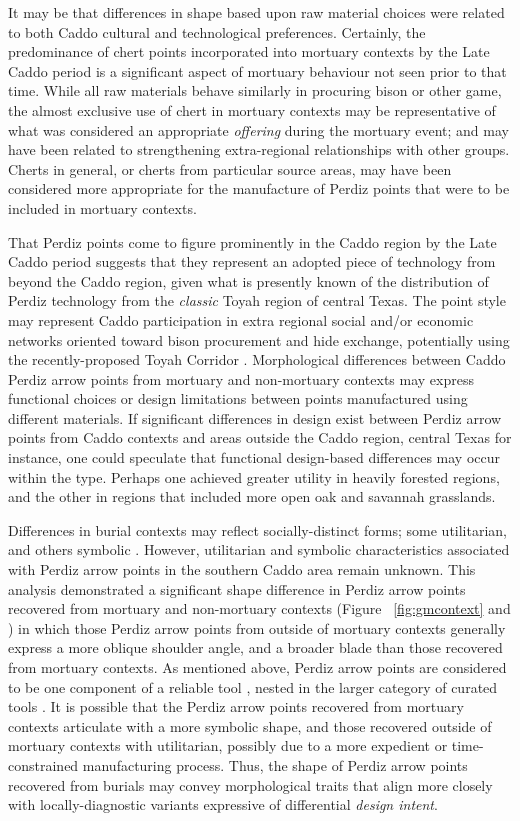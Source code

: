 \documentclass[review]{elsarticle}
\begin{document}
It may be that differences in shape based upon raw material choices were related to both Caddo cultural and technological preferences. Certainly, the predominance of chert points incorporated into mortuary contexts by the Late Caddo period is a significant aspect of mortuary behaviour not seen prior to that time. While all raw materials behave similarly in procuring bison or other game, the almost exclusive use of chert in mortuary contexts may be representative of what was considered an appropriate \textit{offering} during the mortuary event; and may have been related to strengthening extra-regional relationships with other groups. Cherts in general, or cherts from particular source areas, may have been considered more appropriate for the manufacture of Perdiz points that were to be included in mortuary contexts.  

That Perdiz points come to figure prominently in the Caddo region by the Late Caddo period suggests that they represent an adopted piece of technology from beyond the Caddo region, given what is presently known of the distribution of Perdiz technology from the \textit{classic} Toyah region of central Texas. The point style may represent Caddo participation in extra regional social and/or economic networks oriented toward bison procurement and hide exchange, potentially using the recently-proposed Toyah Corridor \citep{RN9002,RN9011}. Morphological differences between Caddo Perdiz arrow points from mortuary and non-mortuary contexts may express functional choices or design limitations between points manufactured using different materials. If significant differences in design exist between Perdiz arrow points from Caddo contexts and areas outside the Caddo region, central Texas for instance, one could speculate that functional design-based differences may occur within the type. Perhaps one achieved greater utility in heavily forested regions, and the other in regions that included more open oak and savannah grasslands.

Differences in burial contexts may reflect socially-distinct forms; some utilitarian, and others symbolic \citep[69]{RN8989}. However, utilitarian and symbolic characteristics associated with Perdiz arrow points in the southern Caddo area remain unknown. This analysis demonstrated a significant shape difference in Perdiz arrow points recovered from mortuary and non-mortuary contexts (Figure ~\ref{fig:gmcontext} and \citealt{RN8980}) in which those Perdiz arrow points from outside of mortuary contexts generally express a more oblique shoulder angle, and a broader blade than those recovered from mortuary contexts. As mentioned above, Perdiz arrow points are considered to be one component of a reliable tool \citep{RN5873}, nested in the larger category of curated tools \citep{RN5880}. It is possible that the Perdiz arrow points recovered from mortuary contexts articulate with a more symbolic shape, and those recovered outside of mortuary contexts with utilitarian, possibly due to a more expedient or time-constrained manufacturing process. Thus, the shape of Perdiz arrow points recovered from burials may convey morphological traits that align more closely with locally-diagnostic variants expressive of differential \textit{design intent}.
\end{document}
